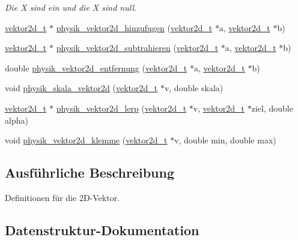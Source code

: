 \begin{DoxyCompactItemize}
\begin{DoxyCompactList}\small\item\em Die X sind ein und die X sind null. \end{DoxyCompactList}\item 
\hyperlink{group__VEKTOR2D_structvektor2d__t}{vektor2d\+\_\+t} $\ast$ \hyperlink{group__VEKTOR2D_gaea1c504f3bee98b2bf6575c6fb80457d}{physik\+\_\+vektor2d\+\_\+hinzufugen} (\hyperlink{group__VEKTOR2D_structvektor2d__t}{vektor2d\+\_\+t} $\ast$a, \hyperlink{group__VEKTOR2D_structvektor2d__t}{vektor2d\+\_\+t} $\ast$b)
\item 
\hyperlink{group__VEKTOR2D_structvektor2d__t}{vektor2d\+\_\+t} $\ast$ \hyperlink{group__VEKTOR2D_gab8c1a14d4e4446abaaf017d8c520ab0d}{physik\+\_\+vektor2d\+\_\+subtrahieren} (\hyperlink{group__VEKTOR2D_structvektor2d__t}{vektor2d\+\_\+t} $\ast$a, \hyperlink{group__VEKTOR2D_structvektor2d__t}{vektor2d\+\_\+t} $\ast$b)
\item 
double \hyperlink{group__VEKTOR2D_ga1ce501d5038b8860e2b3fee21bb31a88}{physik\+\_\+vektor2d\+\_\+entfernung} (\hyperlink{group__VEKTOR2D_structvektor2d__t}{vektor2d\+\_\+t} $\ast$a, \hyperlink{group__VEKTOR2D_structvektor2d__t}{vektor2d\+\_\+t} $\ast$b)
\item 
void \hyperlink{group__VEKTOR2D_ga97e13e4933c07e7bd2cc10e95ea3dbc8}{physik\+\_\+skala\+\_\+vektor2d} (\hyperlink{group__VEKTOR2D_structvektor2d__t}{vektor2d\+\_\+t} $\ast$v, double skala)
\item 
\hyperlink{group__VEKTOR2D_structvektor2d__t}{vektor2d\+\_\+t} $\ast$ \hyperlink{group__VEKTOR2D_ga122ddb3ae52d3f0738672980869f8337}{physik\+\_\+vektor2d\+\_\+lerp} (\hyperlink{group__VEKTOR2D_structvektor2d__t}{vektor2d\+\_\+t} $\ast$v, \hyperlink{group__VEKTOR2D_structvektor2d__t}{vektor2d\+\_\+t} $\ast$ziel, double alpha)
\item 
void \hyperlink{group__VEKTOR2D_ga6f5b6b10e20fa779ea8c710fbe49fc6e}{physik\+\_\+vektor2d\+\_\+klemme} (\hyperlink{group__VEKTOR2D_structvektor2d__t}{vektor2d\+\_\+t} $\ast$v, double min, double max)
\end{DoxyCompactItemize}


\subsection{Ausführliche Beschreibung}
Definitionen für die 2\+D-\/\+Vektor. 

\subsection{Datenstruktur-\/\+Dokumentation}
\label{structvektor2d__t}
\hypertarget{group__VEKTOR2D_structvektor2d__t}{}
